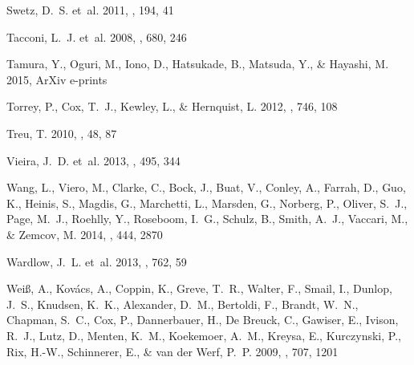 \documentclass[iop]{emulateapj}
\begin{document}
\begin{thebibliography}{106}
{Swetz}, D.~S. {et~al.} 2011, \apjs, 194, 41

{Tacconi}, L.~J. {et~al.} 2008, \apj, 680, 246

{Tamura}, Y., {Oguri}, M., {Iono}, D., {Hatsukade}, B., {Matsuda}, Y., \&
  {Hayashi}, M. 2015, ArXiv e-prints

{Torrey}, P., {Cox}, T.~J., {Kewley}, L., \& {Hernquist}, L. 2012, \apj, 746,
  108

{Treu}, T. 2010, \araa, 48, 87

{Vieira}, J.~D. {et~al.} 2013, \nat, 495, 344

{Wang}, L., {Viero}, M., {Clarke}, C., {Bock}, J., {Buat}, V., {Conley}, A.,
  {Farrah}, D., {Guo}, K., {Heinis}, S., {Magdis}, G., {Marchetti}, L.,
  {Marsden}, G., {Norberg}, P., {Oliver}, S.~J., {Page}, M.~J., {Roehlly}, Y.,
  {Roseboom}, I.~G., {Schulz}, B., {Smith}, A.~J., {Vaccari}, M., \& {Zemcov},
  M. 2014, \mnras, 444, 2870

{Wardlow}, J.~L. {et~al.} 2013, \apj, 762, 59

{Wei{\ss}}, A., {Kov{\'a}cs}, A., {Coppin}, K., {Greve}, T.~R., {Walter}, F.,
  {Smail}, I., {Dunlop}, J.~S., {Knudsen}, K.~K., {Alexander}, D.~M.,
  {Bertoldi}, F., {Brandt}, W.~N., {Chapman}, S.~C., {Cox}, P., {Dannerbauer},
  H., {De Breuck}, C., {Gawiser}, E., {Ivison}, R.~J., {Lutz}, D., {Menten},
  K.~M., {Koekemoer}, A.~M., {Kreysa}, E., {Kurczynski}, P., {Rix}, H.-W.,
  {Schinnerer}, E., \& {van der Werf}, P.~P. 2009, \apj, 707, 1201


\end{thebibliography}
\end{document}

